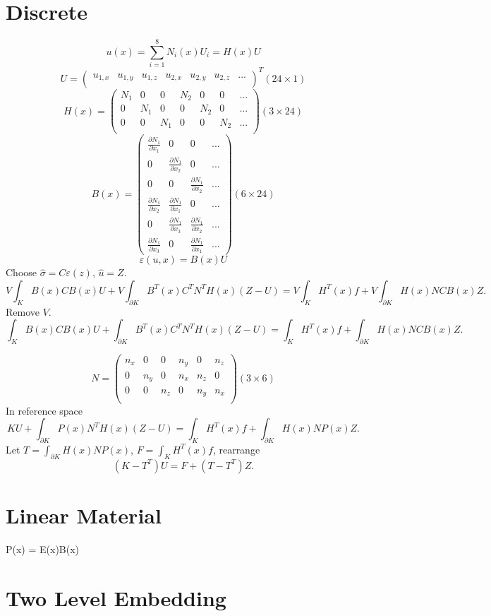 \documentclass{article}
\begin{document}
\section{Discrete}
	\[u(x)=\sum_{i=1}^{8}N_i(x)U_i = H(x)U\]
	\[U = \begin{pmatrix}
	u_{1,x} & u_{1,y} & u_{1,z} & u_{2,x} & u_{2,y} & u_{2,z} & ...\\
	\end{pmatrix}^T(24\times 1)\]
	\[H(x) = \begin{pmatrix}
	  N_1 & 0   & 0   & N_2 & 0   & 0   & ...\\
	  0   & N_1 & 0   & 0   & N_2 & 0   & ...\\
	  0   & 0   & N_1 & 0   & 0   & N_2 & ...\\	  	  
	\end{pmatrix}(3\times 24)\]
	\[B(x) = \begin{pmatrix}
	  \frac{\partial N_1}{\partial x_1} & 0 & 0& ...\\
	  0 & \frac{\partial N_1}{\partial x_2} & 0& ...\\
	  0 & 0 & \frac{\partial N_1}{\partial x_2}& ...\\
 	  \frac{\partial N_1}{\partial x_2} & \frac{\partial N_1}{\partial x_1} & 0& ...\\
  	  0 & \frac{\partial N_1}{\partial x_3} & \frac{\partial N_1}{\partial x_2}& ...\\
  	  \frac{\partial N_1}{\partial x_3} & 0 & \frac{\partial N_1}{\partial x_1}& ...
	\end{pmatrix}(6\times 24)\]
	\[\varepsilon(u,x) = B(x)U\]
	Choose $\hat{\sigma}=C\varepsilon(z)$, $\hat{u}=Z$.
	\[V\int_K B(x)CB(x)U + V\int_{\partial K}B^T(x)C^TN^TH(x)(Z-U)
	=V\int_K H^T(x)f+V\int_{\partial K}H(x)NCB(x)Z.\]
	Remove $V$.
	\[\int_K B(x)CB(x)U + \int_{\partial K}B^T(x)C^TN^TH(x)(Z-U)
	=\int_K H^T(x)f + \int_{\partial K}H(x)NCB(x)Z.\]
	
	\[
	N = \begin{pmatrix}
	n_x & 0   & 0   & n_y & 0   & n_z\\
	0   & n_y & 0   & n_x & n_z & 0 \\
	0   & 0   & n_z & 0   & n_y & n_x  \\		
	\end{pmatrix}(3\times 6)
	\]
	In reference space
	\[KU + \int_{\partial K}P(x)N^TH(x)(Z-U)
	=\int_K H^T(x)f + \int_{\partial K}H(x)NP(x)Z.\]
	Let $T=\int_{\partial K}H(x)NP(x)$, $F = \int_K H^T(x)f$, rearrange
	\[(K-T^T)U=F + (T-T^T)Z.\]
	
\section{Linear Material}
	P(x) = E(x)B(x)
\section{Two Level Embedding}
\end{document}
